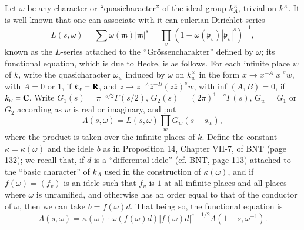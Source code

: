 Let $\omega$ be any character or ``quasicharacter'' of the ideal group $k^{\times}_{A}$, trivial on $k^{\times}$. It is well known that one can associate with it can eulerian Dirichlet series
\begin{equation}
L(s,\omega)=\sum \omega(\mathfrak{m})|\mathfrak{m}|^{s}=\prod\limits_{v}(1-\omega(\mathfrak{p}_{v})|\mathfrak{p}_{v}|^{s})^{-1},\label{art21-eq2}
\end{equation}
known as the $L$-series attached to the ``Gr\"ossencharakter'' defined by $\omega$; its functional equation, which is due to Hecke, is as follows. For each infinite place $w$ of $k$, write the quasicharacter $\omega_{w}$ induced by $\omega$ on $k^{\times}_{w}$ in the form $x\to x^{-A}|x|^{s}w$, with $A=0$ or $1$, if $k_{w}=\mathbf{R}$, and $z\to z^{-A}\overline{z}^{-B}(z\overline{z})^{s}w$, with inf $(A,B)=0$, if $k_{w}=\mathbf{C}$. Write $G_{1}(s)=\pi^{-s/2}\Gamma(s/2)$, $G_{2}(s)=(2\pi)^{1-s}\Gamma(s)$, $G_{w}=G_{1}$ or $G_{2}$ according as $w$ is real or imaginary, and put
$$
\Lambda (s,\omega)=L(s,\omega)\prod\limits_{w}G_{w}(s+s_{w}),
$$
where the product is taken over the infinite places of $k$. Define the constant $\kappa=\kappa(\omega)$ and the idele $b$ as in Proposition 14, Chapter VII-7, of BNT (page 132); we recall that, if $d$ is a ``differental idele'' (cf. BNT, page 113) attached to the ``basic character'' of $k_{A}$ used in the construction of $\kappa(\omega)$, and if $f(\omega)=(f_{v})$ is an idele such that $f_{v}$ is $1$ at all infinite places and all places where $\omega$ is unramified, and otherwise has an order equal to that of the conductor of $\omega$, then we can take $b=f(\omega)d$. That being so, the functional equation is
\begin{equation}
\Lambda (s,\omega)=\kappa(\omega)\cdot \omega(f(\omega)d)|f(\omega)d|^{s-1/2}\Lambda(1-s,\omega^{-1}).\label{art21-eq3}
\end{equation}

